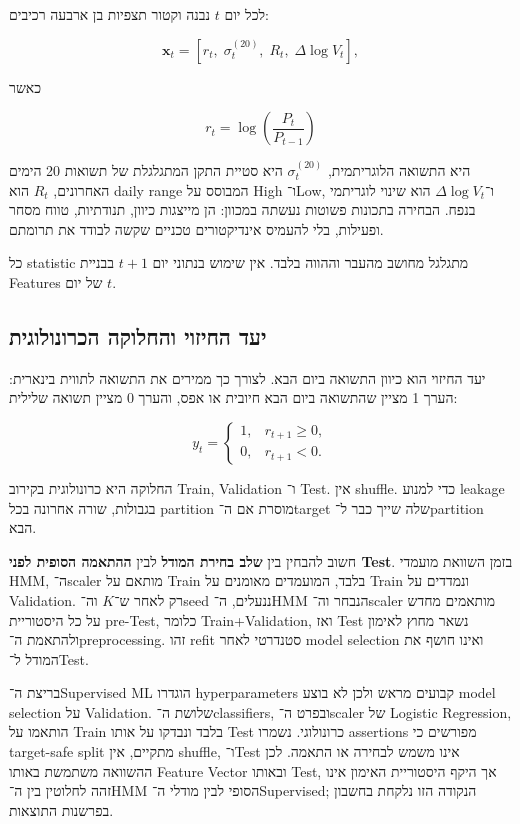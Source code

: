 לכל יום \(t\) נבנה וקטור תצפיות בן ארבעה רכיבים:

\begin{equation}
\mathbf{x}_t = \left[r_t,\; \sigma_t^{(20)},\; R_t,\; \Delta\log V_t\right],
\end{equation}

כאשר

\begin{equation}
r_t = \log\left(\frac{P_t}{P_{t-1}}\right)
\end{equation}

היא התשואה הלוגריתמית, \(\sigma_t^{(20)}\) היא סטיית התקן המתגלגלת של תשואות 20 הימים האחרונים, \(R_t\) הוא daily range המבוסס על High ו־Low, ו־\(\Delta\log V_t\) הוא שינוי לוגריתמי בנפח. הבחירה בתכונות פשוטות נעשתה במכוון: הן מייצגות כיוון, תנודתיות, טווח מסחר ופעילות, בלי להעמיס אינדיקטורים טכניים שקשה לבודד את תרומתם.

כל statistic מתגלגל מחושב מהעבר וההווה בלבד. אין שימוש בנתוני יום \(t+1\) בבניית Features של יום \(t\).

\subsection{יעד החיזוי והחלוקה הכרונולוגית}

יעד החיזוי הוא כיוון התשואה ביום הבא. לצורך כך ממירים את התשואה לתווית בינארית: הערך 1 מציין שהתשואה ביום הבא חיובית או אפס, והערך 0 מציין תשואה שלילית:

\begin{equation}
y_t =
\begin{cases}
1, & r_{t+1} \ge 0,\\
0, & r_{t+1} < 0.
\end{cases}
\end{equation}

החלוקה היא כרונולוגית בקירוב  Train,  Validation ו־ Test. אין shuffle. כדי למנוע leakage בגבולות, שורה אחרונה בכל partition מוסרת אם ה־target שלה שייך כבר ל־partition הבא.

חשוב להבחין בין \textbf{שלב בחירת המודל} לבין \textbf{ההתאמה הסופית לפני Test}. בזמן השוואת מועמדי HMM, ה־scaler מותאם על Train בלבד, המועמדים מאומנים על Train ונמדדים על Validation. רק לאחר ש־\(K\) וה־seed ננעלים, ה־HMM הנבחר וה־scaler מותאמים מחדש על כל היסטוריית pre-Test, כלומר Train+Validation, ואז Test נשאר מחוץ לאימון ולהתאמת ה־preprocessing. זהו refit סטנדרטי לאחר model selection ואינו חושף את המודל ל־Test.

בריצת ה־Supervised ML הוגדרו hyperparameters קבועים מראש ולכן לא בוצע model selection על Validation. שלושת ה־classifiers, ובפרט ה־scaler של Logistic Regression, הותאמו על Train בלבד ונבדקו על אותו Test כרונולוגי. נשמרו assertions מפורשים כי target-safe split מתקיים, אין shuffle, ו־Test אינו משמש לבחירה או התאמה. לכן ההשוואה משתמשת באותו Feature Vector ובאותו Test, אך היקף היסטוריית האימון אינו זהה לחלוטין בין ה־HMM הסופי לבין מודלי ה־Supervised; הנקודה הזו נלקחת בחשבון בפרשנות התוצאות.

